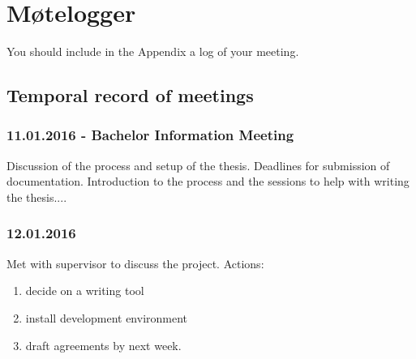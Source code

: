\chapter{Møtelogger}
You should include in the Appendix a log of your meeting.
\section{Temporal record of meetings}
\subsection*{11.01.2016 - Bachelor Information Meeting}
Discussion of the process and setup of the thesis.  Deadlines for submission of documentation.  Introduction to the process and the sessions to help with writing the thesis....

\subsection*{12.01.2016}
Met with supervisor to discuss the project. Actions:
\begin{enumerate}
	\item decide on a writing tool
	\item install development environment
	\item draft agreements by next week.
\end{enumerate}


